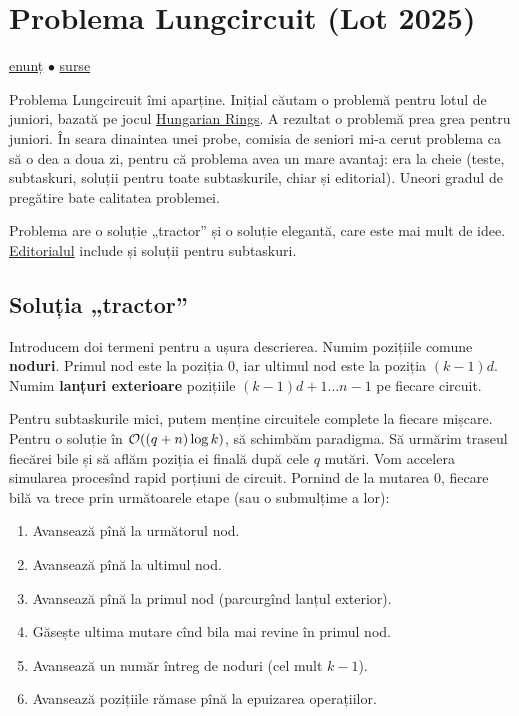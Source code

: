 \documentclass[../main.tex]{subfiles}
\begin{document}
\section{Problema Lungcircuit (Lot 2025)}
\label{problem:lungcircuit}

\href{https://kilonova.ro/problems/3807}{enunț}
$\bullet$
\hyperref[code:lungcircuit]{surse}

Problema Lungcircuit îmi aparține. Inițial căutam o problemă pentru lotul de juniori, bazată pe jocul \href{https://ruwix.com/twisty-puzzles/hungarian-rings-sliding-puzzle/}{Hungarian Rings}. A rezultat o problemă prea grea pentru juniori. În seara dinaintea unei probe, comisia de seniori mi-a cerut problema ca să o dea a doua zi, pentru că problema avea un mare avantaj: era la cheie (teste, subtaskuri, soluții pentru toate subtaskurile, chiar și editorial). Uneori gradul de pregătire bate calitatea problemei. 

Problema are o soluție „tractor” și o soluție elegantă, care este mai mult de idee. \href{https://drive.google.com/drive/folders/1EqiZNtAgVsJ-FbrPRqzF-OIpyOPeztnR}{Editorialul} include și soluții pentru subtaskuri.

\subsection{Soluția „tractor”}

Introducem doi termeni pentru a ușura descrierea. Numim pozițiile comune \textbf{noduri}. Primul nod este la poziția 0, iar ultimul nod este la poziția $(k-1)d$. Numim \textbf{lanțuri exterioare} pozițiile $(k-1)d + 1 \dots n - 1$ pe fiecare circuit.

Pentru subtaskurile mici, putem menține circuitele complete la fiecare mișcare. Pentru o soluție în $\mathcal{O}((q + n) \log k)$, să schimbăm paradigma. Să urmărim traseul fiecărei bile și să aflăm poziția ei finală după cele $q$ mutări. Vom accelera simularea procesînd rapid porțiuni de circuit. Pornind de la mutarea 0, fiecare bilă va trece prin următoarele etape (sau o submulțime a lor):

\begin{enumerate}
  \item Avansează pînă la următorul nod.
  \item Avansează pînă la ultimul nod.
  \item Avansează pînă la primul nod (parcurgînd lanțul exterior).
  \item Găsește ultima mutare cînd bila mai revine în primul nod.
  \item Avansează un număr întreg de noduri (cel mult $k-1$).
  \item Avansează pozițiile rămase pînă la epuizarea operațiilor.
\end{enumerate}
\end{document}
